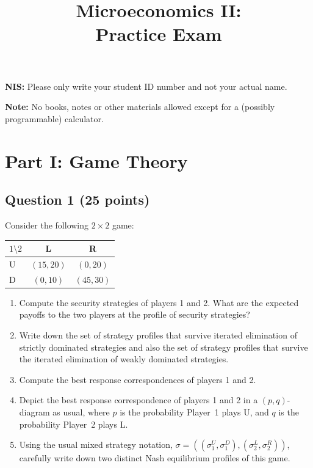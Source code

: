 \documentclass[12pt,a4paper]{article}
\title{\textbf{Microeconomics II:}\\[0.25em]
       \Large Practice Exam}
\author{ }
\date{ }
\begin{document}
\maketitle

\bigskip
\noindent\textbf{NIS:} Please only write your student ID number and not your actual name.

\bigskip
\noindent\textbf{Note:} No books, notes or other materials allowed except for a (possibly programmable) calculator.

\bigskip
\noindent\hrulefill
\bigskip


\section*{Part I: Game Theory}

\subsection*{Question 1 (25 points)}

Consider the following \(2\times2\) game:

\begin{table}[h!]
  \centering
  \renewcommand{\arraystretch}{1.1}
  \begin{tabular}{lcc}
    \toprule
    $1 \setminus 2$ & L & R \\
    \midrule
    U & $(15,20)$ & $(0,20)$ \\
    D & $(0,10)$ & $(45,30)$ \\
    \bottomrule
  \end{tabular}
\end{table}

\begin{enumerate}
  \item Compute the security strategies of players 1 and 2. What are the expected payoffs to the two players at the profile of security strategies?
  \item Write down the set of strategy profiles that survive iterated elimination of strictly dominated strategies and also the set of strategy profiles that survive the iterated elimination of weakly dominated strategies.
  \item Compute the best response correspondences of players 1 and 2.
  \item Depict the best response correspondence of players 1 and 2 in a \((p, q)\)-diagram as usual, where \(p\) is the probability Player~1 plays U, and \(q\) is the probability Player~2 plays L.
  \item Using the usual mixed strategy notation, \(\sigma=((\sigma_{1}^{U},\sigma_{1}^{D}), (\sigma_{2}^{L},\sigma_{2}^{R}))\), carefully write down two distinct Nash equilibrium profiles of this game.
\end{enumerate}
\end{document}
